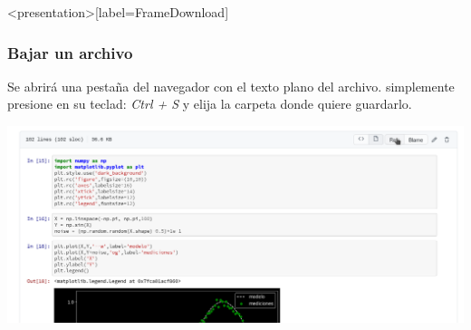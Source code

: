 \begin{frame}<presentation>[label=FrameDownload]
  \frametitle{Bajar un archivo}


 { 
Se abrirá una pestaña del navegador con el texto plano del archivo. simplemente presione en su teclad:
  \emph{Ctrl + S} y elija la carpeta donde quiere guardarlo.
}

\center 
\includegraphics[width=\textwidth]{Screenshots/PressRaw.png}

\end{frame}


